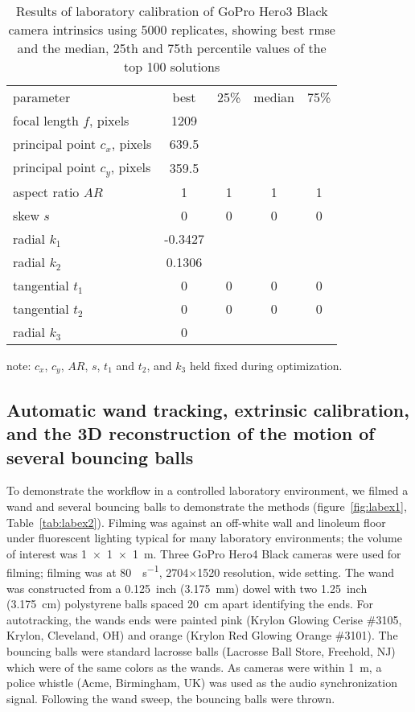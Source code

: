 \documentclass[fleqn,10pt]{wlpeerj}
\begin{document}
\begin{table}
\caption{Results of laboratory calibration of GoPro Hero3 Black camera intrinsics using 5000 replicates, showing best rmse and the median, 25th and 75th percentile values of the top 100 solutions}
\label{tab:labcal2}
\begin{center}
\begin{tabular}{lcccc}
parameter & best & 25\% & median & 75\% \\
\cline{1-5}
focal length $f$, pixels & 1209 & & &\\
principal point $c_x$, pixels & 639.5 & & & \\
principal point $c_y$, pixels & 359.5 & & & \\
aspect ratio $AR$ & 1 & 1 & 1 & 1\\skew $s$ & 0 & 0 & 0 & 0 \\
radial $k_1$ & -0.3427 & & & \\
radial $k_2$ & 0.1306 & & & \\
tangential $t_1$ & 0 & 0 & 0 & 0 \\
tangential $t_2$ & 0 & 0 & 0 & 0 \\
radial $k_3$ & 0 & & & \\
\end{tabular}
\end{center}
note: $c_x$, $c_y$, $AR$, $s$, $t_1$ and $t_2$, and $k_3$ held fixed during optimization.
\end{table}





\subsection*{Automatic wand tracking, extrinsic calibration, and the 3D reconstruction of the motion of several bouncing balls}
To demonstrate the workflow in a controlled laboratory environment, we filmed a wand and several bouncing balls to demonstrate the methods (figure~\ref{fig:labex1}, Table~\ref{tab:labex2}).  Filming was against an off-white wall and linoleum floor under fluorescent lighting typical for many laboratory environments; the volume of interest was \SI{1x1x1}{\meter}.  Three GoPro Hero4 Black cameras were used for filming; filming was at \SI{80}{\frame\per\second}, 2704$\times$1520 resolution, wide setting.  The wand was constructed from a \SI{0.125}{inch} (\SI{3.175}{\milli\meter}) dowel with two \SI{1.25}{inch} (\SI{3.175}{\centi\meter}) polystyrene balls spaced \SI{20}{\centi\meter} apart identifying the ends. For autotracking, the wands ends were painted pink (Krylon Glowing Cerise \#3105, Krylon, Cleveland, OH) and orange (Krylon Red Glowing Orange \#3101).  The bouncing balls were standard lacrosse balls (Lacrosse Ball Store, Freehold, NJ) which were of the same colors as the wands.  As cameras were within \SI{1}{\meter}, a police whistle (Acme, Birmingham, UK) was used as the audio synchronization signal.  Following the wand sweep, the bouncing balls were thrown.  
\end{document}
